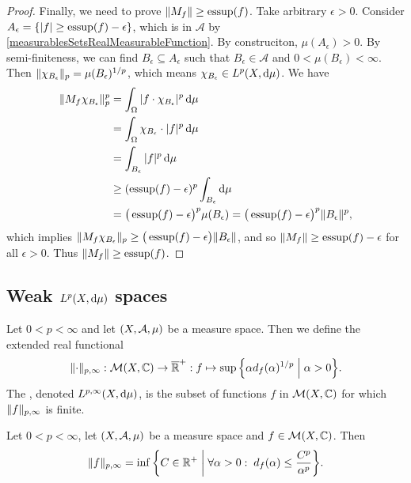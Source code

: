 \begin{proof}
Finally, we need to prove $\lVert M_f\rVert \geq \operatorname{essup}(f)$. Take arbitrary $\epsilon > 0$. Consider $A_\epsilon = \{|f| \geq \operatorname{essup}(f)-\epsilon\}$, which is in $\mathcal{A}$ by \ref{measurablesSetsRealMeasurableFunction}. By construciton, $\mu(A_\epsilon) > 0$. By semi-finiteness, we can find $B_\epsilon\subseteq A_\epsilon$ such that $B_\epsilon\in \mathcal{A}$ and $0 < \mu(B_\epsilon)< \infty$. Then $\lVert\chi_{B_\epsilon}\rVert_p = \mu(B_\epsilon)^{1/p}$, which means $\chi_{B_\epsilon}\in L^p(X, \operatorname{d \!}{\mu})$. We have
\begin{align*}
\lVert M_f\chi_{B_\epsilon}\rVert_p^p &= \int_\Omega |f\cdot \chi_{B_\epsilon}|^{p}\operatorname{d \!}{\mu} \\
&= \int_\Omega \chi_{B_\epsilon}\cdot|f|^p\operatorname{d \!}{\mu} \\
&= \int_{B_\epsilon}|f|^p\operatorname{d \!}{\mu} \\
&\geq (\operatorname{essup}(f)-\epsilon)^p\int_{B_\epsilon}\operatorname{d \!}{\mu} \\
&= \big(\operatorname{essup}(f)-\epsilon\big)^p\mu(B_\epsilon) = \big(\operatorname{essup}(f)-\epsilon\big)^p\lVert B_\epsilon\rVert^p,
\end{align*}
which implies $\lVert M_f\chi_{B_\epsilon}\rVert_p \geq \big(\operatorname{essup}(f)-\epsilon\big)\lVert B_\epsilon\rVert$, and so $\lVert M_f\rVert \geq \operatorname{essup}(f)-\epsilon$ for all $\epsilon >0$. Thus $\lVert M_f\rVert \geq \operatorname{essup}(f)$.
\end{proof}

\subsection{Weak $L^p(X,\operatorname{d \!}{\mu})$ spaces}
\begin{definition}
Let $0<p<\infty$ and let $\sSet{X,\mathcal{A}, \mu}$ be a measure space. Then we define the extended real functional
\[ \norm{\cdot}_{p,\infty}: \meas(X, \C)\to \overline{\R}^+: f\mapsto \sup\setbuilder{\alpha d_f(\alpha)^{1/p}}{\alpha > 0}. \]
The , denoted $L^{p,\infty}(X,\operatorname{d \!}{\mu})$, is the subset of functions $f$ in $\operatorname{\mathcal{M}}(X, \mathbb{C})$ for which $\lVert f\rVert_{p,\infty}$ is finite.
\end{definition}

\begin{lemma}
Let $0<p<\infty$, let $\sSet{X,\mathcal{A}, \mu}$ be a measure space and $f\in \operatorname{\mathcal{M}}(X, \mathbb{C})$. Then
\[ \norm{f}_{p,\infty} = \inf\setbuilder{C\in \R^+}{\forall \alpha>0: \; d_f(\alpha) \leq \frac{C^p}{\alpha^p}}. \]
\end{lemma}


